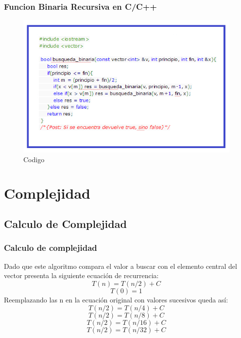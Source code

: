 \documentclass{beamer}
\begin{document}
		\begin{frame}
			\frametitle{Funcion Binaria Recursiva en C/C++}
			\begin{figure}
  				\centering
    			           \includegraphics[scale=0.6]{CodigoC.png}
  				\caption{Codigo}
  				\label{fig:lls}
			\end{figure}
			
		\end{frame}

		
\section{Complejidad}

	\subsection{Calculo de Complejidad}

		\begin{frame}
			\frametitle{Calculo de complejidad}
			Dado que este algoritmo compara el valor a buscar con el elemento central del vector presenta la siguiente ecuación de recurrencia:
			\begin{equation}
					T(n) = T(n/2) + C
				\end{equation}
			\begin{equation}
					T(0) = 1
				\end{equation}
Reemplazando las n en la ecuación original con valores sucesivos queda así:
             \begin{equation}
					T(n/2) = T(n/4) + C
				\end{equation}
				  \begin{equation}
					T(n/2) = T(n/8) + C
				\end{equation}
				  \begin{equation}
					T(n/2) = T(n/16) + C
				\end{equation}
				  \begin{equation}
					T(n/2) = T(n/32) + C
				\end{equation}
		\end{frame}
\end{document}

